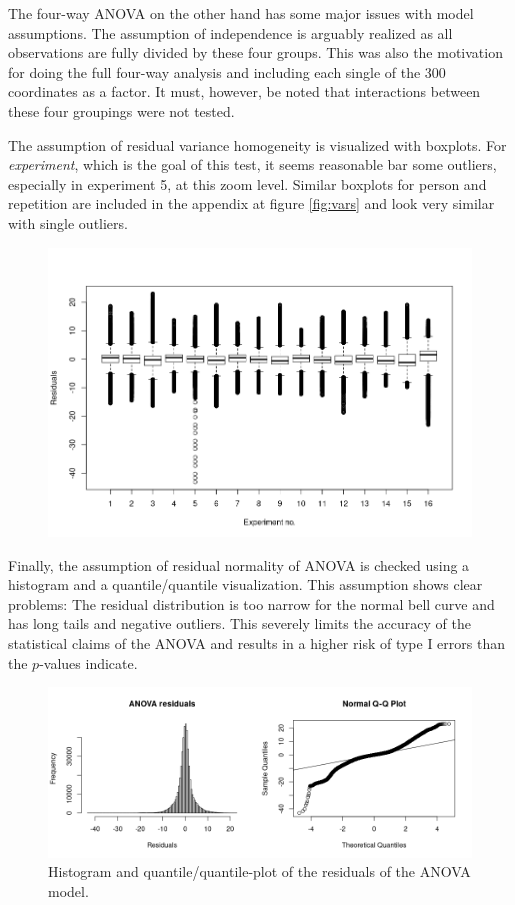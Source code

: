 \documentclass[11pt,fleqn]{article}
\begin{document}
The four-way ANOVA on the other hand has some major issues with model assumptions. The assumption of independence is arguably realized as all observations are fully divided by these four groups. This was also the motivation for doing the full four-way analysis and including each single of the 300 coordinates as a factor. It must, however, be noted that interactions between these four groupings were not tested.

The assumption of residual variance homogeneity is visualized with boxplots. For \textit{experiment}, which is the goal of this test, it seems reasonable bar some outliers, especially in experiment 5, at this zoom level. Similar boxplots for person and repetition are included in the appendix  at figure \ref{fig:vars} and look very similar with single outliers.
\begin{figure}[H]
	\centering
	\includegraphics[width=.7\textwidth]{var_exp}
\label{fig:vexp}
\end{figure}\noindent
Finally, the assumption of residual normality of ANOVA is checked using a histogram and a quantile/quantile visualization. This assumption shows clear problems: The residual distribution is too narrow for the normal bell curve and has long tails and negative outliers. This severely limits the accuracy of the statistical claims of the ANOVA and results in a higher risk of type I errors than the \(p\)-values indicate.
\begin{figure}[H]
	\centering
	\includegraphics[width=.7\textwidth]{qq}
	\caption{Histogram and quantile/quantile-plot of the residuals of the ANOVA model.}\label{fig:qq}
\end{figure}
\end{document}
